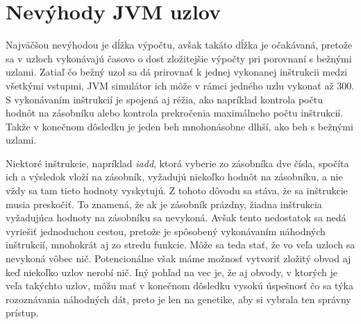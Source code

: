 \section{Nevýhody JVM uzlov}
\label{sec:disadvantages}

Najväčšou nevýhodou je dĺžka výpočtu, avšak takáto dĺžka je očakávaná, pretože sa v uzloch vykonávajú časovo o dosť zložitejšie výpočty pri porovnaní s bežnými uzlami. Zatiaľ čo bežný uzol sa dá prirovnať k jednej vykonanej inštrukcii medzi všetkými vstupmi, JVM simulátor ich môže v rámci jedného uzlu vykonať až 300. S vykonávaním inštrukcií je spojená aj réžia, ako napríklad kontrola počtu hodnôt na zásobníku alebo kontrola prekročenia maximálneho počtu inštrukcií. Takže v konečnom dôsledku je jeden beh mnohonásobne dlhší, ako beh s bežnými uzlami.

Niektoré inštrukcie, napríklad \textit{iadd}, ktorá vyberie zo zásobníka dve čísla, spočíta ich a výsledok vloží na zásobník, vyžadujú niekoľko hodnôt na zásobníku, a nie vždy sa tam tieto hodnoty vyskytujú. Z tohoto dôvodu sa stáva, že sa inštrukcie musia preskočiť. To znamená, že ak je zásobník prázdny, žiadna inštrukcia vyžadujúca hodnoty na zásobníku sa nevykoná. Avšak tento nedostatok sa nedá vyriešiť jednoduchou cestou, pretože je spôsobený vykonávaním náhodných inštrukcií, mnohokrát aj zo stredu funkcie. Môže sa teda stať, že vo veľa uzloch sa nevykoná vôbec nič. Potencionálne však máme možnosť vytvoriť zložitý obvod aj keď niekoľko uzlov nerobí nič. Iný pohľad na vec je, že aj obvody, v ktorých je veľa takýchto uzlov, môžu mať v konečnom dôsledku vysokú úspešnosť čo sa týka rozoznávania náhodných dát, preto je len na genetike, aby si vybrala ten správny prístup. 
